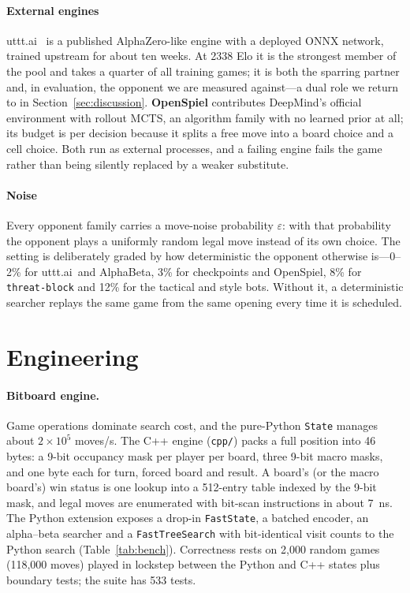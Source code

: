 \documentclass[conference]{IEEEtran}
\newcommand{\code}[1]{\texttt{#1}}
\newcommand{\utttai}{uttt.ai}
\begin{document}
\paragraph{External engines}
\utttai\ \cite{waczynski2021utttai} is a published AlphaZero-like engine
with a deployed ONNX network, trained upstream for about ten weeks. At 2338
Elo it is the strongest member of the pool and takes a quarter of all
training games; it is both the sparring partner and, in evaluation, the
opponent we are measured against---a dual role we return to in
Section~\ref{sec:discussion}. \textbf{OpenSpiel} \cite{lanctot2019openspiel}
contributes DeepMind's official environment with rollout MCTS, an algorithm
family with no learned prior at all; its budget is per decision because it
splits a free move into a board choice and a cell choice. Both run as
external processes, and a failing engine fails the game rather than being
silently replaced by a weaker substitute.

\paragraph{Noise}
Every opponent family carries a move-noise probability $\varepsilon$: with
that probability the opponent plays a uniformly random legal move instead of
its own choice. The setting is deliberately graded by how deterministic the
opponent otherwise is---0--2\% for \utttai\ and AlphaBeta, 3\% for
checkpoints and OpenSpiel, 8\% for \code{threat-block} and 12\% for the
tactical and style bots. Without it, a deterministic searcher replays the
same game from the same opening every time it is scheduled.

\section{Engineering}
\label{sec:eng}

\paragraph{Bitboard engine.}
Game operations dominate search cost, and the pure-Python \code{State}
manages about $2\times10^5$ moves/s. The C++ engine (\code{cpp/}) packs a
full position into 46 bytes: a 9-bit occupancy mask per player per board,
three 9-bit macro masks, and one byte each for turn, forced board and
result. A board's (or the macro board's) win status is one lookup into a
512-entry table indexed by the 9-bit mask, and legal moves are enumerated
with bit-scan instructions in about 7~ns. The Python extension exposes a
drop-in \code{FastState}, a batched encoder, an alpha--beta searcher and a
\code{FastTreeSearch} with bit-identical visit counts to the Python search
(Table~\ref{tab:bench}). Correctness rests on 2{,}000 random games
(118{,}000 moves) played in lockstep between the Python and C++ states plus
boundary tests; the suite has 533 tests.
\end{document}
